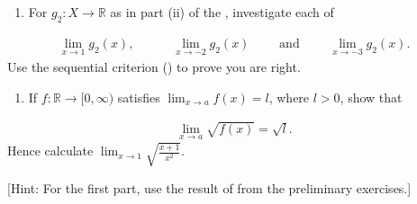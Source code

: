 \documentclass[letterpaper,10pt,english]{jupyterBook}
\begin{document}
\label{\detokenize{Problems:id4}}\begin{enumerate}
%
\setcounter{enumi}{3}
\item {} 
\sphinxAtStartPar
For \(g_2:X\to \mathbb{R}\) as in part (ii) of the {\hyperref[\detokenize{Problems:id1}]{}}, investigate each of

\end{enumerate}
\begin{equation*}
\begin{split}
\lim_{x \rightarrow 1}g_{2}(x), \hspace{3em} \lim_{x \rightarrow -2}g_{2}(x) \hspace{2em} \text{ and } \hspace{2em} \lim_{x \rightarrow -3}g_{2}(x).
\end{split}
\end{equation*}
\sphinxAtStartPar
Use the sequential criterion () to prove you are right.

\label{\detokenize{Problems:id5}}\begin{enumerate}
%
\setcounter{enumi}{4}
\item {} 
\sphinxAtStartPar
If \(f: \mathbb{R} \rightarrow [0, \infty)\) satisfies \(\displaystyle\lim_{x \rightarrow a} f(x) = l\), where \(l > 0\), show that

\end{enumerate}
\begin{equation*}
\begin{split}
\lim_{x \rightarrow a} \sqrt{f(x)} = \sqrt{l}.
\end{split}
\end{equation*}
\sphinxAtStartPar
Hence calculate \(\displaystyle\lim_{x \rightarrow 1}\sqrt{\displaystyle\frac{x+1}{x^{2}}}\).

{[}Hint: For the first part, use the result of {\hyperref[\detokenize{Problems:p4}]{}} from the preliminary exercises.{]}
\end{document}

